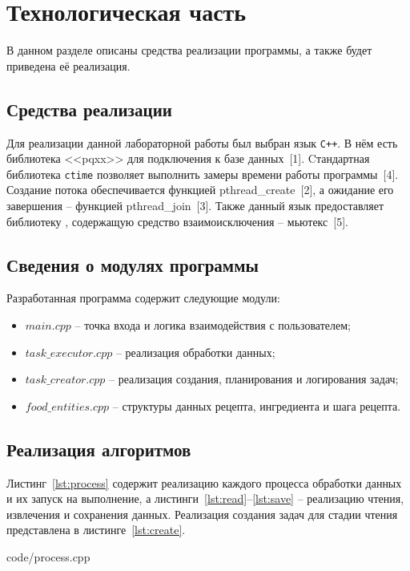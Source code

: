 \chapter{Технологическая часть}

В данном разделе описаны средства реализации программы, а также будет приведена её реализация.

\section{Средства реализации}
Для реализации данной лабораторной работы был выбран язык \texttt{C++}.
В нём есть библиотека <<pqxx>> для подключения к базе данных~[1].
Cтандартная библиотека \texttt{ctime} позволяет выполнить замеры времени работы программы~[4].
Создание потока обеспечивается функцией pthread\_create~[2], а ожидание его завершения -- функцией pthread\_join~[3].
Также данный язык предоставляет библиотеку , содержащую средство взаимоисключения -- мьютекс~[5].

\section{Сведения о модулях программы}
Разработанная программа содержит следующие модули:
\begin{itemize}
	\item $main.cpp$ -- точка входа и логика взаимодействия с пользователем;
	\item $task\_executor.cpp$ -- реализация обработки данных;
	\item $task\_creator.cpp$ -- реализация создания, планирования и логирования задач;
	\item $food\_entities.cpp$ -- структуры данных рецепта, ингредиента и шага рецепта.
\end{itemize}

\section{Реализация алгоритмов}

Листинг~\ref{lst:process} содержит реализацию каждого процесса обработки данных и их запуск на выполнение, а листинги~\ref{lst:read}--\ref{lst:save} -- реализацию чтения, извлечения и сохранения данных.
Реализация создания задач для стадии чтения представлена в листинге~\ref{lst:create}.

 {code/process.cpp}

